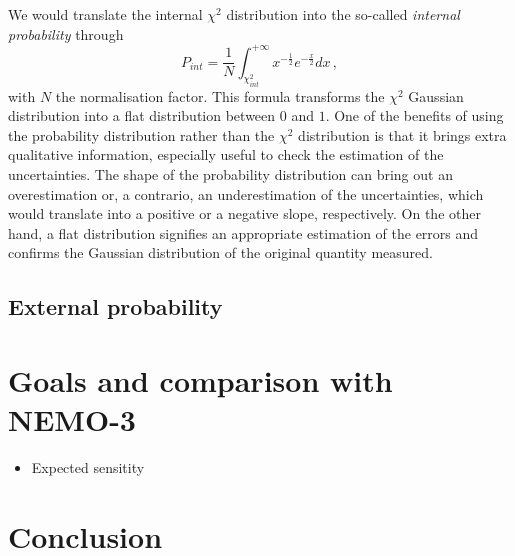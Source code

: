 We would translate the internal $\chi^{2}$ distribution into the so-called \emph{internal probability} through
\begin{equation}
  P_{int} = \frac{1}{N}\int_{\chi^{2}_{int}}^{+\infty}x^{-\frac{1}{2}}e^{-\frac{x}{2}}dx\,,
  \label{eq:chi2_Pint}
\end{equation}
with $N$ the normalisation factor.
This formula transforms the $\chi^{2}$ Gaussian distribution into a flat distribution between $0$ and $1$.
One of the benefits of using the probability distribution rather than the $\chi^{2}$ distribution is that it brings extra qualitative information, especially useful to check the estimation of the uncertainties.
The shape of the probability distribution can bring out an overestimation or, a contrario, an underestimation of the uncertainties, which would translate into a positive or a negative slope, respectively.
On the other hand, a flat distribution signifies an appropriate estimation of the errors and confirms the Gaussian distribution of the original quantity measured.



\subsection{External probability}


\section{Goals and comparison with NEMO-3}

\begin{itemize}
\item Expected sensitity
\end{itemize}

\section{Conclusion}
